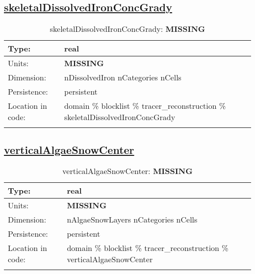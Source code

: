\subsection[skeletalDissolvedIronConcGrady]{\hyperref[sec:var_tab_tracer_reconstruction]{skeletalDissolvedIronConcGrady}}
\label{subsec:var_sec_tracer_reconstruction_skeletalDissolvedIronConcGrady}
\begin{center}
\begin{longtable}{| p{2.0in} | p{4.0in} |}
        \hline 
        Type: & real \\
        \hline 
        Units: & {\bf \color{red} MISSING} \\
        \hline 
        Dimension: & nDissolvedIron nCategories nCells \\
        \hline 
        Persistence: & persistent \\
        \hline 
         Location in code: & domain \% blocklist \% tracer\_reconstruction \% skeletalDissolvedIronConcGrady \\
         \hline 
    \caption{skeletalDissolvedIronConcGrady: {\bf \color{red} MISSING}}
\end{longtable}
\end{center}
\subsection[verticalAlgaeSnowCenter]{\hyperref[sec:var_tab_tracer_reconstruction]{verticalAlgaeSnowCenter}}
\label{subsec:var_sec_tracer_reconstruction_verticalAlgaeSnowCenter}
\begin{center}
\begin{longtable}{| p{2.0in} | p{4.0in} |}
        \hline 
        Type: & real \\
        \hline 
        Units: & {\bf \color{red} MISSING} \\
        \hline 
        Dimension: & nAlgaeSnowLayers nCategories nCells \\
        \hline 
        Persistence: & persistent \\
        \hline 
         Location in code: & domain \% blocklist \% tracer\_reconstruction \% verticalAlgaeSnowCenter \\
         \hline 
    \caption{verticalAlgaeSnowCenter: {\bf \color{red} MISSING}}
\end{longtable}
\end{center}
